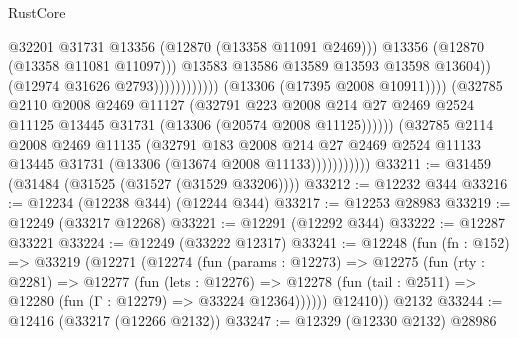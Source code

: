 \begin{lexlean}{RustCore}
\begin{coremodule}
                                                        @32201
                                                        @31731
                                                        @13356
                                                        (@12870 (@13358 @11091 @2469)))
                                                      @13356
                                                      (@12870 (@13358 @11081 @11097)))
                                                    @13583
                                                    @13586
                                                    @13589
                                                    @13593
                                                    @13598
                                                    @13604))
                                                (@12974 @31626 @2793))))))))))))
                          (@13306 (@17395 @2008 @10911))))
                      (@32785
                        @2110
                        @2008
                        @2469
                        @11127
                        (@32791
                          @223
                          @2008
                          @214
                          @27
                          @2469
                          @2524
                          @11125
                          @13445
                          @31731
                          (@13306 (@20574 @2008 @11125))))))
                  (@32785
                    @2114
                    @2008
                    @2469
                    @11135
                    (@32791
                      @183
                      @2008
                      @214
                      @27
                      @2469
                      @2524
                      @11133
                      @13445
                      @31731
                      (@13306 (@13674 @2008 @11133)))))))))))
@33211 := @31459 (@31484 (@31525 (@31527 (@31529 @33206))))
@33212 := @12232 @344
@33216 := @12234 (@12238 @344) (@12244 @344)
@33217 := @12253 @28983
@33219 := @12249 (@33217 @12268)
@33221 := @12291 (@12292 @344)
@33222 := @12287 @33221
@33224 := @12249 (@33222 @12317)
@33241 := @12248
    (fun (fn : @152) =>
    @33219
      (@12271
        (@12274
          (fun (params : @12273) =>
          @12275
            (fun (rty : @2281) =>
            @12277
              (fun (lets : @12276) =>
              @12278 (fun (tail : @2511) => @12280 (fun (Γ : @12279) => @33224 @12364))))))
        @12410))
    @2132
@33244 := @12416 (@33217 (@12266 @2132))
@33247 := @12329 (@12330 @2132) @28986

\end{coremodule}
\end{lexlean}
